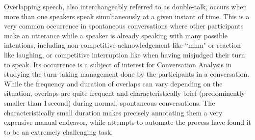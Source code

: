 \documentclass[a4paper]{article}
\begin{document}
Overlapping speech, also interchangeably referred to as double-talk,
occurs when more than one speakers speak simultaneously at a given instant of time.
This is a very common occurrence in spontaneous conversations where other participants make an utterance while a speaker is already speaking with many possible intentions,
including non-competitive acknowledgement like “mhm" or reaction like laughing,
or competitive interruption like when having misjudged their turn to speak.
Its occurrence
is a subject of interest for Conversation Analysis in studying the turn-taking management done by the participants in a conversation.
While the frequency and duration of overlaps can vary depending on the situation,
overlaps are quite frequent and characteristically brief (predominently smaller than 1\,second)
during normal, spontaneous conversations.  %
The characteristically small duration makes precisely annotating them a very expensive manual endeavor,
while attempts to automate the process have found it to be an extremely challenging task.
\end{document}
